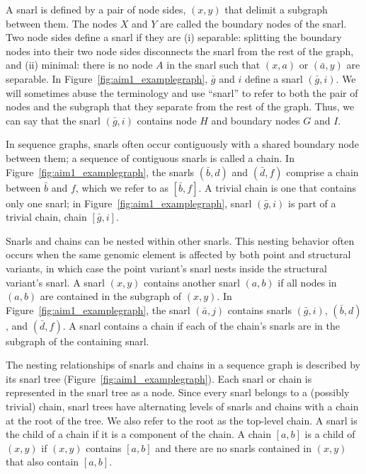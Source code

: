 \documentclass[11pt]{ucscthesis}
\begin{document}
A snarl is defined by a pair of node sides, $(x, y)$ that delimit a subgraph between them.
The nodes $X$ and $Y$ are called the boundary nodes of the snarl.
Two node sides define a snarl if they are (i) separable: splitting the boundary nodes into their two node sides disconnects the snarl from the rest of the graph, and (ii) minimal: there is no node $A$ in the snarl such that $(x, a)$ or $(\bar{a}, y)$ are separable.
In Figure~\ref{fig:aim1_examplegraph}, $\bar{g}$ and $i$ define a snarl $(\bar{g}, i)$.
We will sometimes abuse the terminology and use ``snarl'' to refer to both the pair of nodes and the subgraph that they separate from the rest of the graph.
Thus, we can say that the snarl $(\bar{g}, i)$ contains node $H$ and boundary nodes $G$ and $I$.


In sequence graphs, snarls often occur contiguously with a shared boundary node between them; a sequence of contiguous snarls is called a chain.
In Figure~\ref{fig:aim1_examplegraph}, the snarls $(\bar{b}, d)$ and $(\bar{d}, f)$ comprise a chain between $\bar{b}$ and $f$, which we refer to as $[\bar{b}, f]$.
A trivial chain is one that contains only one snarl; in Figure~\ref{fig:aim1_examplegraph}, snarl $(\bar{g}, i)$ is part of a trivial chain, chain $[\bar{g}, i]$.

Snarls and chains can be nested within other snarls. 
This nesting behavior often occurs when the same genomic element is affected by both point and structural variants, in which case the point variant's snarl nests inside the structural variant's snarl.
A snarl $(x, y)$ contains another snarl $(a, b)$ if all nodes in $(a, b)$ are contained in the subgraph of $(x, y)$.
In Figure~\ref{fig:aim1_examplegraph}, the snarl $(\bar{a}, j)$ contains snarls $(\bar{g}, i)$, $(\bar{b}, d)$, and $(\bar{d}, f)$.
A snarl contains a chain if each of the chain's snarls are in the subgraph of the containing snarl.

The nesting relationships of snarls and chains in a sequence graph is described by its snarl tree (Figure~\ref{fig:aim1_examplegraph}).
Each snarl or chain is represented in the snarl tree as a node. 
Since every snarl belongs to a (possibly trivial) chain, snarl trees have alternating levels of snarls and chains with a chain at the root of the tree.
We also refer to the root as the top-level chain.
A snarl is the child of a chain if it is a component of the chain.
A chain $[a, b]$ is a child of $(x, y)$ if $(x, y)$ contains $[a, b]$ and there are no snarls contained in $(x, y)$ that also contain $[a, b]$.
\end{document}
